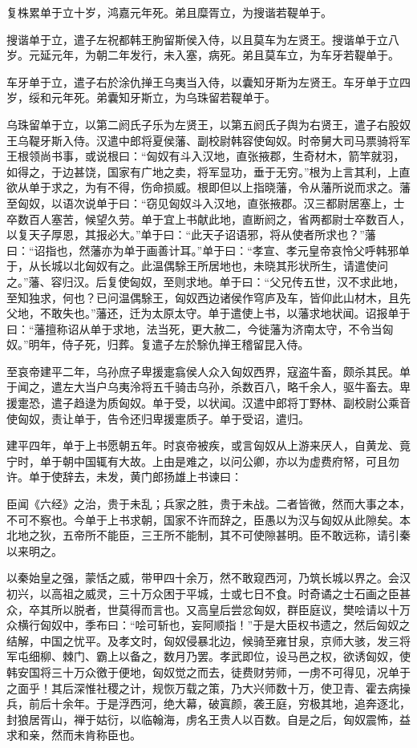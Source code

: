 \documentclass[]{article}
\begin{document}
复株累单于立十岁，鸿嘉元年死。弟且糜胥立，为搜谐若鞮单于。

搜谐单于立，遣子左祝都韩王朐留斯侯入侍，以且莫车为左贤王。搜谐单于立八岁。元延元年，为朝二年发行，未入塞，病死。弟且莫车立，为车牙若鞮单于。

车牙单于立，遣子右於涂仇掸王乌夷当入侍，以囊知牙斯为左贤王。车牙单于立四岁，绥和元年死。弟囊知牙斯立，为乌珠留若鞮单于。

乌珠留单于立，以第二阏氏子乐为左贤王，以第五阏氏子舆为右贤王，遣子右股奴王乌鞮牙斯入侍。汉遣中郎将夏侯藩、副校尉韩容使匈奴。时帝舅大司马票骑将军王根领尚书事，或说根曰：``匈奴有斗入汉地，直张掖郡，生奇材木，箭竿就羽，如得之，于边甚饶，国家有广地之卖，将军显功，垂于无穷。''根为上言其利，上直欲从单于求之，为有不得，伤命损威。根即但以上指晓藩，令从藩所说而求之。藩至匈奴，以语次说单于曰：``窃见匈奴斗入汉地，直张掖郡。汉三都尉居塞上，士卒数百人塞苦，候望久劳。单于宜上书献此地，直断阏之，省两都尉士卒数百人，以复天子厚恩，其报必大。''单于曰：``此天子诏语邪，将从使者所求也？''藩曰：``诏指也，然藩亦为单于画善计耳。''单于曰：``孝宣、孝元皇帝哀怜父呼韩邪单于，从长城以北匈奴有之。此温偶駼王所居地也，未晓其形状所生，请遣使问之。''藩、容归汉。后复使匈奴，至则求地。单于曰：``父兄传五世，汉不求此地，至知独求，何也？已问温偶駼王，匈奴西边诸侯作穹庐及车，皆仰此山材木，且先父地，不敢失也。''藩还，迁为太原太守。单于遣使上书，以藩求地状闻。诏报单于曰：``藩擅称诏从单于求地，法当死，更大赦二，今徙藩为济南太守，不令当匈奴。''明年，侍子死，归葬。复遣子左於駼仇掸王稽留昆入侍。

至哀帝建平二年，乌孙庶子卑援疐翕侯人众入匈奴西界，寇盗牛畜，颇杀其民。单于闻之，遣左大当户乌夷泠将五千骑击乌孙，杀数百八，略千余人，驱牛畜去。卑援疐恐，遣子趋逯为质匈奴。单于受，以状闻。汉遣中郎将丁野林、副校尉公乘音使匈奴，责让单于，告令还归卑援疐质子。单于受诏，遣归。

建平四年，单于上书愿朝五年。时哀帝被疾，或言匈奴从上游来厌人，自黄龙、竟宁时，单于朝中国辄有大故。上由是难之，以问公卿，亦以为虚费府帑，可且勿许。单于使辞去，未发，黄门郎扬雄上书谏曰：

臣闻《六经》之治，贵于未乱；兵家之胜，贵于未战。二者皆微，然而大事之本，不可不察也。今单于上书求朝，国家不许而辞之，臣愚以为汉与匈奴从此隙矣。本北地之狄，五帝所不能臣，三王所不能制，其不可使隙甚明。臣不敢远称，请引秦以来明之。

以秦始皇之强，蒙恬之威，带甲四十余万，然不敢窥西河，乃筑长城以界之。会汉初兴，以高祖之威灵，三十万众困于平城，士或七日不食。时奇谲之士石画之臣甚众，卒其所以脱者，世莫得而言也。又高皇后尝忿匈奴，群臣庭议，樊哙请以十万众横行匈奴中，季布曰：``哙可斩也，妄阿顺指！''于是大臣权书遗之，然后匈奴之结解，中国之忧平。及孝文时，匈奴侵暴北边，候骑至雍甘泉，京师大骇，发三将军屯细柳、棘门、霸上以备之，数月乃罢。孝武即位，设马邑之权，欲诱匈奴，使韩安国将三十万众徼于便地，匈奴觉之而去，徒费财劳师，一虏不可得见，况单于之面乎！其后深惟社稷之计，规恢万载之策，乃大兴师数十万，使卫青、霍去病操兵，前后十余年。于是浮西河，绝大幕，破寘颜，袭王庭，穷极其地，追奔逐北，封狼居胥山，禅于姑衍，以临翰海，虏名王贵人以百数。自是之后，匈奴震怖，益求和亲，然而未肯称臣也。
\end{document}
